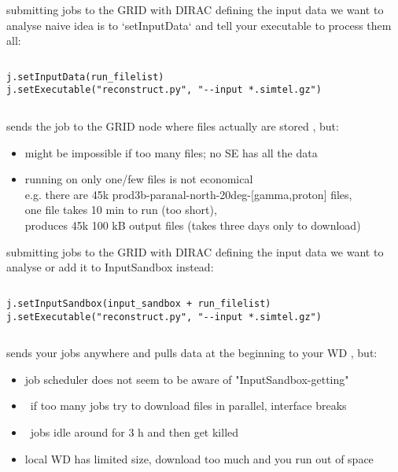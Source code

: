 \documentclass{beamer}
\begin{document}
\begin{frame}[fragile]{submitting jobs to the GRID with DIRAC}
                      {defining the input data we want to analyse}
    naive idea is to `setInputData` and tell your executable to process them all:
    \begin{columns}
        \begin{lstlisting}[basicstyle=\scriptsize,firstnumber=38]
j.setInputData(run_filelist)
j.setExecutable("reconstruct.py", "--input *.simtel.gz")
\end{lstlisting}
    \end{columns}
    sends the job to the GRID node where files actually are stored%
    \pause
    , but:
    \begin{itemize}
        \item might be impossible if too many files; no SE has all the data
        \pause
        \item running on only one/few files is not economical\\
            e.g. there are 45k prod3b-paranal-north-20deg-[gamma,proton] files,\\
            one file takes 10 min to run (too short),\\
            produces 45k 100 kB output files (takes three days only to download)
    \end{itemize}
\end{frame}


\begin{frame}[fragile]{submitting jobs to the GRID with DIRAC}
                      {defining the input data we want to analyse}
    or add it to InputSandbox instead:
    \begin{columns}
        \begin{lstlisting}[basicstyle=\scriptsize,firstnumber=37]
j.setInputSandbox(input_sandbox + run_filelist)
j.setExecutable("reconstruct.py", "--input *.simtel.gz")
        \end{lstlisting}
    \end{columns}
    sends your jobs anywhere and pulls data at the beginning to your WD\pause
    , but:
    \begin{itemize}
        \item job scheduler does not seem to be aware of "InputSandbox-getting"
        \pause
        \item \textrightarrow\ if too many jobs try to download files in parallel,
            interface breaks
        \pause
        \item \textrightarrow\ jobs idle around for 3 h and then get killed
        \pause
        \item local WD has limited size, download too much and you run out of space
    \end{itemize}
\end{frame}
\end{document}
